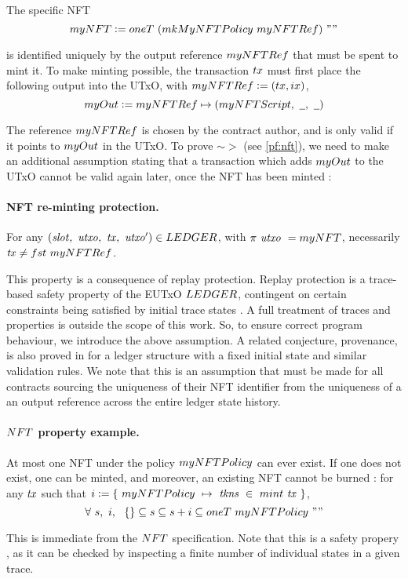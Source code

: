 The specific NFT
\[ \fun{myNFT} \leteq \fun{oneT}~(\fun{mkMyNFTPolicy}~ \fun{myNFTRef})~"" \]

is identified uniquely by the output reference $\fun{myNFTRef}$ that must be
spent to mint it. To make minting possible, the transaction $\fun{tx}$ must first place the
following output into the UTxO, with $\fun{myNFTRef} \leteq (\fun{tx}, \fun{ix})$,
\[ \fun{myOut} \leteq \fun{myNFTRef} \mapsto (\fun{myNFTScript},~\wcard, ~\wcard) \]

The reference $\fun{myNFTRef}$ is chosen by the contract author, and is only
valid if it points to $\fun{myOut}$ in the UTxO. To prove $\sim >$ (see \ref{pf:nft}),
we need to make an additional assumption stating that a transaction which
adds $\fun{myOut}$ to the UTxO cannot be valid again later, once the NFT
has been minted :

\paragraph{NFT re-minting protection.}
For any $(\var{slot},~\var{utxo},~\var{tx},~\var{utxo'}) \in \LEDGER$, with
$\pi~\var{utxo}~= \fun{myNFT}$, necessarily $\var{tx} \neq \fun{fst}~\mathsf{myNFTRef}$.

This property is a consequence of replay protection. Replay protection is a trace-based
safety property
\cite{liveness} of the EUTxO $\LEDGER$, contingent on certain constraints being satisfied by initial
trace states \cite{properties}. A full treatment of traces and properties is outside
the scope of this work. So, to ensure correct program behaviour, we introduce
the above assumption.
A related conjecture, provenance, is also proved in \cite{eutxoma}
for a ledger structure with a fixed initial state and similar validation rules.
We note that this is an assumption that must be made for all contracts sourcing
the uniqueness of their NFT identifier from the uniqueness of a an output
reference across the entire ledger state history.


\paragraph{$\fun{NFT}$ property example.}
At most one NFT under the policy $\fun{myNFTPolicy}$ can ever exist.
If one does not exist, one can be minted, and
moreover, an existing NFT cannot be burned : for any $\mathit{tx}$ such that
$i \leteq \{~\fun{myNFTPolicy}~\mapsto~\var{tkns}~\in~ \fun{mint}~\var{tx}~\}$,
\[ \forall~ s,~i,~~ \{\} \subseteq s \subseteq s + i \subseteq \fun{oneT}~\fun{myNFTPolicy}~"" \]

This is immediate from the $\fun{NFT}$ specification. Note that this is a safety
propery \cite{liveness}, as it can be checked by inspecting a finite number
of individual states in a given trace. 
